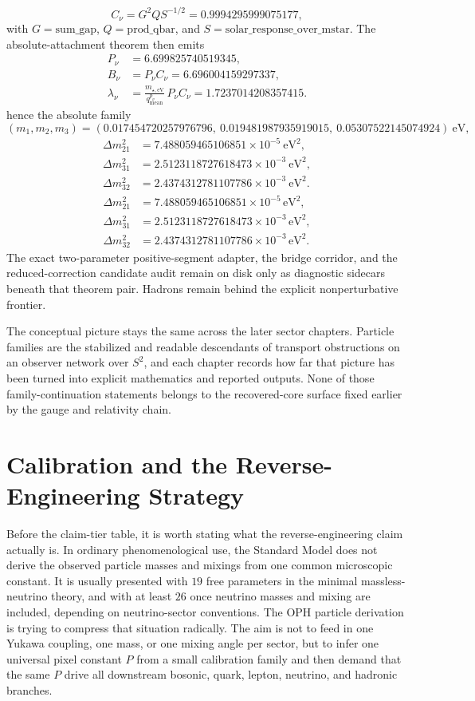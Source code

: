 \documentclass[11pt]{article}
\begin{document}
\[
C_\nu = G^2 Q S^{-1/2} = 0.9994295999075177,
\]
with \(G=\mathrm{sum\_gap}\), \(Q=\mathrm{prod\_qbar}\), and \(S=\mathrm{solar\_response\_over\_mstar}\).
The absolute-attachment theorem then emits
\[
\begin{aligned}
P_\nu&=6.699825740519345,\\
B_\nu&=P_\nu C_\nu=6.696004159297337,\\
\lambda_\nu&=\frac{m_{\star,\mathrm{eV}}}{q_{\mathrm{mean}}^{p_\nu}}\,P_\nu C_\nu=1.7237014208357415.
\end{aligned}
\]
hence the absolute family
\[
(m_1,m_2,m_3)=(0.017454720257976796,\ 0.019481987935919015,\ 0.05307522145074924)\ \mathrm{eV},
\]
\[
\begin{aligned}
\Delta m_{21}^2&=7.488059465106851\times10^{-5}\ \mathrm{eV}^2,\\
\Delta m_{31}^2&=2.5123118727618473\times10^{-3}\ \mathrm{eV}^2,\\
\Delta m_{32}^2&=2.4374312781107786\times10^{-3}\ \mathrm{eV}^2.
\end{aligned}
\]
\[
\begin{aligned}
\Delta m_{21}^2&=7.488059465106851\times10^{-5}\,\mathrm{eV}^2,\\
\Delta m_{31}^2&=2.5123118727618473\times10^{-3}\,\mathrm{eV}^2,\\
\Delta m_{32}^2&=2.4374312781107786\times10^{-3}\,\mathrm{eV}^2.
\end{aligned}
\]
The exact two-parameter positive-segment adapter, the bridge corridor, and the reduced-correction candidate audit remain on disk only as diagnostic sidecars beneath that theorem pair. Hadrons remain behind the explicit nonperturbative frontier.

The conceptual picture stays the same across the later sector chapters. Particle families are the
stabilized and readable descendants of transport obstructions on an observer network over \(S^2\),
and each chapter records how far that picture has been turned into explicit mathematics and
reported outputs. None of those family-continuation statements belongs to the recovered-core
surface fixed earlier by the gauge and relativity chain.

\section{Calibration and the Reverse-Engineering Strategy}

Before the claim-tier table, it is worth stating what the reverse-engineering claim actually is. In
ordinary phenomenological use, the Standard Model does not derive the observed particle masses and
mixings from one common microscopic constant. It is usually presented with \(19\) free parameters
in the minimal massless-neutrino theory, and with at least \(26\) once neutrino masses and mixing
are included, depending on neutrino-sector conventions. The OPH particle derivation is trying to
compress that situation radically. The aim is not to feed in one Yukawa coupling, one mass, or
one mixing angle per sector, but to infer one universal pixel constant \(P\) from a small
calibration family and then demand that the same \(P\) drive all downstream bosonic, quark,
lepton, neutrino, and hadronic branches.
\end{document}
